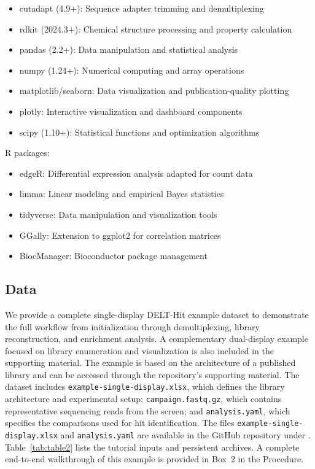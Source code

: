 \documentclass[pdflatex,sn-nature]{sn-jnl}
\begin{document}
\begin{itemize}
  \item cutadapt (4.9+): Sequence adapter trimming and demultiplexing
  \item rdkit (2024.3+): Chemical structure processing and property calculation
  \item pandas (2.2+): Data manipulation and statistical analysis
  \item numpy (1.24+): Numerical computing and array operations
  \item matplotlib/seaborn: Data visualization and publication-quality plotting
  \item plotly: Interactive visualization and dashboard components
  \item scipy (1.10+): Statistical functions and optimization algorithms
\end{itemize}
R packages:

\begin{itemize}
  \item edgeR: Differential expression analysis adapted for count data
  \item limma: Linear modeling and empirical Bayes statistics
  \item tidyverse: Data manipulation and visualization tools
  \item GGally: Extension to ggplot2 for correlation matrices
  \item BiocManager: Bioconductor package management
\end{itemize}

\subsection{Data}
We provide a complete single-display DELT-Hit example dataset to demonstrate the full workflow from initialization through demultiplexing, library reconstruction, and enrichment analysis. A complementary dual-display example focused on library enumeration and visualization is also included in the supporting material. The example is based on the architecture of a published library\cite{bassi_singlestrandeddnaencodedchemical_2020} and can be accessed through the repository's supporting material.
The dataset includes \texttt{example-single-display.xlsx}, which defines the library architecture and experimental setup; \texttt{campaign.fastq.gz}, which contains representative sequencing reads from the screen; and \texttt{analysis.yaml}, which specifies the comparisons used for hit identification. The files \texttt{example-single-display.xlsx} and \texttt{analysis.yaml} are available in the GitHub repository under . Table~\ref{tab:table2} lists the tutorial inputs and persistent archives. A complete end-to-end walkthrough of this example is provided in Box~2 in the Procedure.
\end{document}
